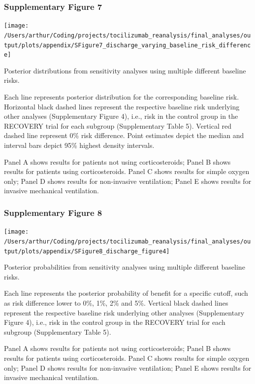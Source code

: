 \documentclass[
]{article}
\begin{document}
\hypertarget{supplementary-figure-7}{%
\subsubsection{Supplementary Figure 7}\label{supplementary-figure-7}}

\begin{center}\texttt{[image: /Users/arthur/Coding/projects/tocilizumab\_reanalysis/final\_analyses/output/plots/appendix/SFigure7\_discharge\_varying\_baseline\_risk\_difference]} \end{center}

Posterior distributions from sensitivity analyses using multiple
different baseline risks.

Each line represents posterior distribution for the corresponding
baseline risk. Horizontal black dashed lines represent the respective
baseline risk underlying other analyses (Supplementary Figure 4), i.e.,
risk in the control group in the RECOVERY trial for each subgroup
(Supplementary Table 5). Vertical red dashed line represent 0\% risk
difference. Point estimates depict the median and interval bars depict
95\% highest density intervals.

Panel A shows results for patients not using corticosteroids; Panel B
shows results for patients using corticosteroids. Panel C shows results
for simple oxygen only; Panel D shows results for non-invasive
ventilation; Panel E shows results for invasive mechanical ventilation.

\newpage

\hypertarget{supplementary-figure-8}{%
\subsubsection{Supplementary Figure 8}\label{supplementary-figure-8}}

\begin{center}\texttt{[image: /Users/arthur/Coding/projects/tocilizumab\_reanalysis/final\_analyses/output/plots/appendix/SFigure8\_discharge\_figure4]} \end{center}

Posterior probabilities from sensitivity analyses using multiple
different baseline risks.

Each line represents the posterior probability of benefit for a specific
cutoff, such as risk difference lower to 0\%, 1\%, 2\% and 5\%. Vertical
black dashed lines represent the respective baseline risk underlying
other analyses (Supplementary Figure 4), i.e., risk in the control group
in the RECOVERY trial for each subgroup (Supplementary Table 5).

Panel A shows results for patients not using corticosteroids; Panel B
shows results for patients using corticosteroids. Panel C shows results
for simple oxygen only; Panel D shows results for non-invasive
ventilation; Panel E shows results for invasive mechanical ventilation.
\end{document}
